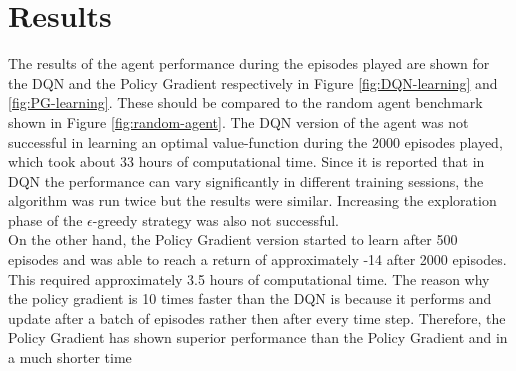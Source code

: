 \documentclass[a4paper, 11pt]{article}
\begin{document}
\section{Results}
The results of the agent performance during the episodes played are shown for the DQN and the Policy Gradient respectively in Figure \ref{fig:DQN-learning} and \ref{fig:PG-learning}. These should be compared to the random agent benchmark shown in Figure \ref{fig:random-agent}. The DQN version of the agent was not successful in learning an optimal value-function during the 2000 episodes played, which took about 33 hours of computational time. Since it is reported that in DQN the performance can vary significantly in different training sessions, the algorithm was run twice but the results were similar. Increasing the exploration phase of the $\epsilon$-greedy strategy was also not successful.\\
On the other hand, the Policy Gradient version started to learn after 500 episodes and was able to reach a return of approximately -14 after 2000 episodes. This required approximately 3.5 hours of computational time. The reason why the policy gradient is 10 times faster than the DQN is because it performs and update after a batch of episodes rather then after every time step. Therefore, the Policy Gradient has shown superior performance than the Policy Gradient and in a much shorter time
\end{document}
